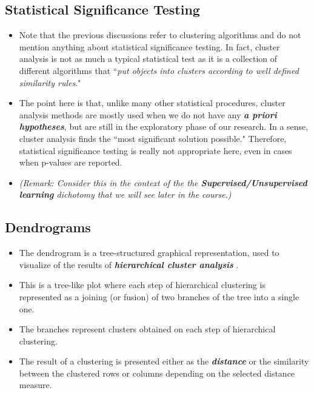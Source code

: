 \documentclass[a4paper,12pt]{article}
\begin{document}
\subsection{Statistical Significance Testing}

\begin{itemize}
\item Note that the previous discussions refer to clustering algorithms and do not mention anything about statistical significance testing. In fact, cluster analysis is not as much a typical statistical test as it is a collection of different algorithms that ``\textit{put objects into clusters according to well defined similarity rules}."
	
\item The point here is that, unlike many other statistical procedures, cluster analysis methods are mostly used when we do not have any \textbf{\textit{a priori hypotheses}}, but are still in the exploratory phase of our research. In a sense, cluster analysis finds the ``most significant solution possible." Therefore, statistical significance testing is really not appropriate here, even in cases when p-values are reported.
\item \textit{(Remark: Consider this in the context of the the \textbf{Supervised/Unsupervised learning} dichotomy that we will see later in the course.)}
\end{itemize}


\subsection{Dendrograms}
\begin{itemize}
	
\item The dendrogram is a tree-structured graphical representation, used to visualize of the results of \textbf{\textit{hierarchical cluster analysis}} . 
\item This is a tree-like plot where each step of hierarchical clustering is represented as a joining (or fusion) of two branches of the tree into a single one. 
\item The branches represent clusters obtained on each step of hierarchical clustering. 
\item The result of a clustering is presented either as the \textbf{\textit{distance}} or the similarity between the clustered rows or columns depending on the selected distance measure.
\end{itemize}
\end{document}
